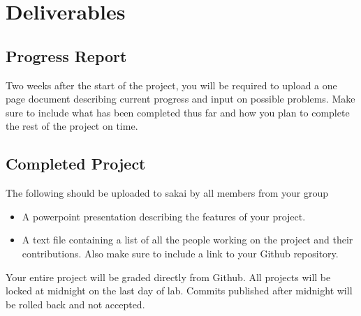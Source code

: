 \documentclass[11pt]{article} %
\begin{document}
\section{Deliverables}
\subsection{Progress Report}

Two weeks after the start of the project, you will be required to upload a one page document describing current progress and input on possible problems. Make sure to include what has been completed thus far and how you plan to complete the rest of the project on time.

\subsection{Completed Project}
The following should be uploaded to sakai by all members from your group

\begin{itemize}
	\item A powerpoint presentation describing the features of your project.
	\item A text file containing a list of all the people working on the project and their contributions. Also make sure to include a link to your Github repository.
\end{itemize}

Your entire project will be graded directly from Github. All projects will be locked at midnight on the last day of lab. Commits published after midnight will be rolled back and not accepted. 
\end{document}
